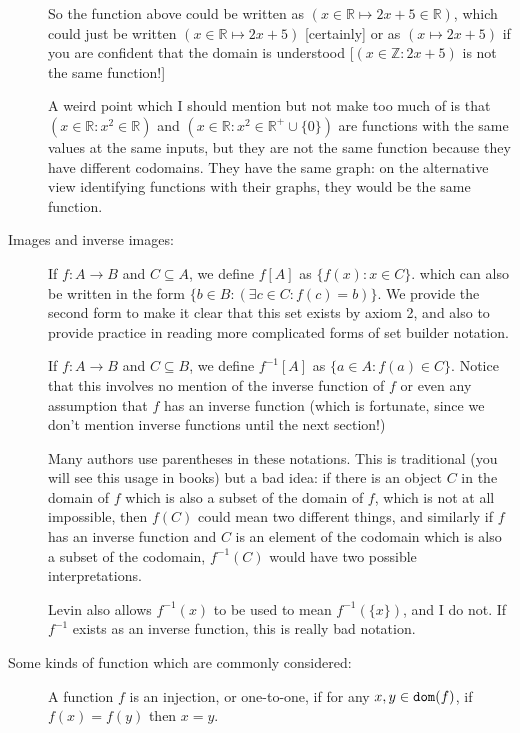 \documentclass[12pt]{article}
\begin{document}
\begin{description}
So the function above could be written as $(x \in \mathbb R \mapsto 2x+5 \in \mathbb R)$, which could just be written $(x \in \mathbb R \mapsto 2x+5)$ [certainly] or as
$(x \mapsto 2x+5)$ if you are confident that the domain is understood [$(x \in \mathbb Z:2x+5)$ is not the same function!]

A weird point which I should mention but not make too much of is that $(x \in {\mathbb R}:x^2 \in \mathbb R)$ and $(x \in {\mathbb R}:x^2 \in \mathbb R^+ \cup \{0\})$ are functions with the same values at the same inputs, but they are not the same function because they have different codomains.  They have the same graph:  on the alternative view identifying functions with their graphs, they would be the same function.


\item[Images and inverse images:]

If $f:A \rightarrow B$ and $C \subseteq A$, we define $f[A]$ as $\{f(x):x \in C\}$. which can also be written in the form $\{b \in B:(\exists c \in C:f(c)=b)\}$.  We provide the second form to make it clear
that this set exists by axiom 2, and also to provide practice in reading more complicated forms of set builder notation.

If $f:A \rightarrow B$ and $C \subseteq B$, we define $f^{-1}[A]$ as $\{a \in A:f(a) \in C\}$.  Notice that this involves no mention of the inverse function of $f$ or even any assumption that $f$ has an inverse function (which is fortunate, since we don't mention inverse functions until the next section!)

Many authors use parentheses in these notations.  This is traditional (you will see this usage in books) but a bad idea:  if there is an object $C$ in the domain of $f$ which is also a subset of the domain of $f$, which is not at all impossible,
then $f(C)$ could mean two different things, and similarly if $f$ has an inverse function and $C$ is an element of the codomain which is also a subset of the codomain, $f^{-1}(C)$ would have two possible interpretations.

Levin also allows $f^{-1}(x)$ to be used to mean $f^{-1}(\{x\})$, and I do not.  If $f^{-1}$ exists as an inverse function, this is really bad notation.


\item[Some kinds of function which are commonly considered:]

A function $f$ is an injection, or one-to-one, if for any $x,y \in {\tt dom}(f)$, if $f(x)=f(y)$ then $x=y$.


\end{description}
\end{document}
